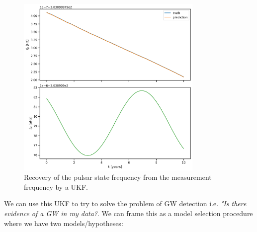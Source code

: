 \documentclass{tufte-handout} %
\begin{document}
\begin{figure}
	\includegraphics[width=0.8\textwidth]{images/model}
	\caption{Recovery of the pulsar state frequency from the measurement frequency by a UKF.}
	\label{fig:model example}
\end{figure}
\noindent We can use this UKF to try to solve the problem of GW detection i.e. \textit{"Is there evidence of a GW in my data?}. We can frame this as a model selection procedure where we have two models/hypotheses:
\end{document}
